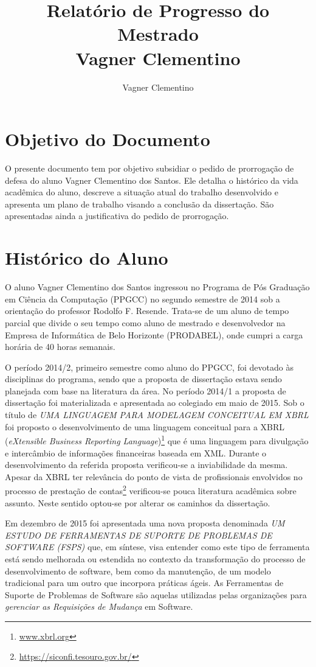 \documentclass[10pt,a4paper]{report}
\author{Vagner Clementino}
\title{Relatório de Progresso do Mestrado\\
	Vagner Clementino}
\begin{document}
\maketitle

	
\section{Objetivo do Documento}
\label{sec:objetivo}

O presente documento tem por objetivo subsidiar o pedido de prorrogação de defesa do aluno Vagner Clementino dos Santos. Ele detalha o histórico da vida acadêmica do aluno, descreve a situação atual do trabalho desenvolvido e apresenta um plano de trabalho visando a conclusão da dissertação. São apresentadas ainda a justificativa do pedido de prorrogação.

\section{Histórico do Aluno}
\label{sec:historico}

O aluno Vagner Clementino dos Santos ingressou no Programa de Pós Graduação em Ciência da Computação (PPGCC) no segundo semestre de 2014 sob a orientação do professor Rodolfo F. Resende. Trata-se de um aluno de tempo parcial que divide o seu tempo como aluno de mestrado e desenvolvedor na Empresa de Informática de Belo Horizonte (PRODABEL), onde cumpri a carga horária de 40 horas semanais. 

O período 2014/2, primeiro semestre como aluno do PPGCC, foi devotado às disciplinas do programa, sendo que a proposta de dissertação estava sendo planejada com base na literatura da área. No período 2014/1 a proposta de dissertação foi materializada e apresentada ao colegiado em maio de 2015. Sob o título de \textit{UMA LINGUAGEM PARA MODELAGEM CONCEITUAL EM XBRL} foi proposto o desenvolvimento de uma linguagem conceitual para a XBRL (\textit{eXtensible Business Reporting Language})\footnote{\url{www.xbrl.org}} que é uma linguagem para divulgação e intercâmbio de informações financeiras baseada em XML. Durante o desenvolvimento da referida proposta verificou-se a inviabilidade da mesma. Apesar da XBRL ter relevância do ponto de vista de profissionais envolvidos no processo de prestação de contas\footnote{\url{https://siconfi.tesouro.gov.br/}} verificou-se pouca literatura acadêmica sobre assunto. Neste sentido optou-se por alterar os caminhos da dissertação.

Em dezembro de 2015 foi apresentada uma nova proposta denominada  \textit{UM ESTUDO DE FERRAMENTAS DE SUPORTE DE PROBLEMAS DE SOFTWARE (FSPS)} que, em síntese, visa entender como este tipo de ferramenta está sendo melhorada ou estendida no contexto da transformação do processo de desenvolvimento de software, bem como da manutenção, de um modelo tradicional para um outro que incorpora práticas ágeis. As Ferramentas de Suporte de Problemas de Software são aquelas utilizadas pelas organizações para \textit{gerenciar as Requisições de Mudança}\cite{1703974} em Software. 
\end{document}
